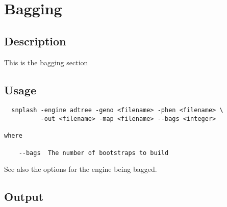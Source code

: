 \section{Bagging}
\label{sec:bagging}
\subsection{Description}
This is the bagging section
\subsection{Usage}
\begin{verbatim}
  snplash -engine adtree -geno <filename> -phen <filename> \
          -out <filename> -map <filename> --bags <integer>
             
where

    --bags  The number of bootstraps to build
\end{verbatim}

See also the options for the engine being bagged.

\subsection{Output}

